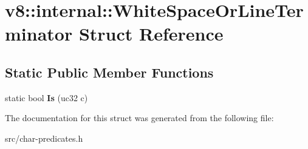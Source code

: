 \hypertarget{structv8_1_1internal_1_1_white_space_or_line_terminator}{}\section{v8\+:\+:internal\+:\+:White\+Space\+Or\+Line\+Terminator Struct Reference}
\label{structv8_1_1internal_1_1_white_space_or_line_terminator}
\subsection*{Static Public Member Functions}
\begin{DoxyCompactItemize}
\item 
\hypertarget{structv8_1_1internal_1_1_white_space_or_line_terminator_a235e354b953caff6855bc64170378de1}{}static bool {\bfseries Is} (uc32 c)\label{structv8_1_1internal_1_1_white_space_or_line_terminator_a235e354b953caff6855bc64170378de1}

\end{DoxyCompactItemize}


The documentation for this struct was generated from the following file\+:\begin{DoxyCompactItemize}
\item 
src/char-\/predicates.\+h\end{DoxyCompactItemize}
